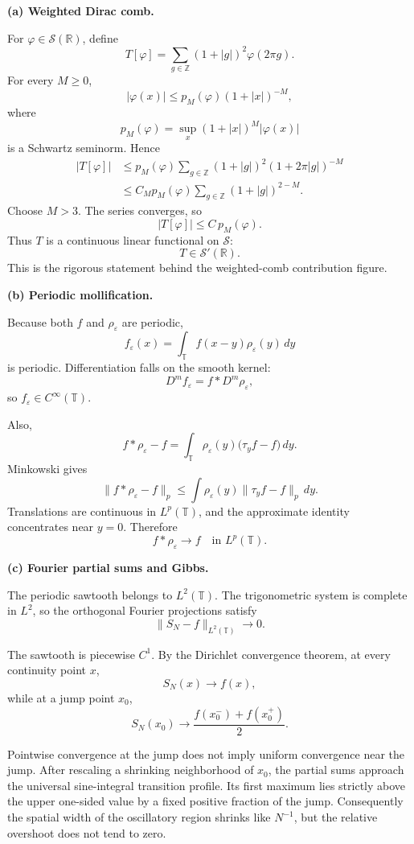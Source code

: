 \begin{solution}
\par\smallskip\noindent\textbf{(a) Weighted Dirac comb.}

For \(\varphi\in\mathcal S(\mathbb R)\), define
\[
T[\varphi]
=
\sum_{g\in\mathbb Z}
(1+|g|)^2\varphi(2\pi g).
\]
For every \(M\ge0\),
\[
|\varphi(x)|
\le
p_M(\varphi)(1+|x|)^{-M},
\]
where
\[
p_M(\varphi)
=
\sup_x
(1+|x|)^M|\varphi(x)|
\]
is a Schwartz seminorm. Hence
\[
\begin{aligned}
|T[\varphi]|
&\le
p_M(\varphi)
\sum_{g\in\mathbb Z}
(1+|g|)^2(1+2\pi|g|)^{-M}\\
&\le
C_M p_M(\varphi)
\sum_{g\in\mathbb Z}
(1+|g|)^{2-M}.
\end{aligned}
\]
Choose \(M>3\). The series converges, so
\[
|T[\varphi]|
\le
C\,p_M(\varphi).
\]
Thus \(T\) is a continuous linear functional on \(\mathcal S\):
\[
\boxed{
T\in\mathcal S'(\mathbb R).}
\]
This is the rigorous statement behind the weighted-comb contribution
figure.

\par\smallskip\noindent\textbf{(b) Periodic mollification.}

Because both \(f\) and \(\rho_\varepsilon\) are periodic,
\[
f_\varepsilon(x)
=
\int_{\mathbb T}
f(x-y)\rho_\varepsilon(y)\,dy
\]
is periodic. Differentiation falls on the smooth kernel:
\[
D^m f_\varepsilon
=
f*D^m\rho_\varepsilon,
\]
so \(f_\varepsilon\in C^\infty(\mathbb T)\).

Also,
\[
f*\rho_\varepsilon-f
=
\int_{\mathbb T}
\rho_\varepsilon(y)
\bigl(\tau_yf-f\bigr)\,dy.
\]
Minkowski gives
\[
\|f*\rho_\varepsilon-f\|_p
\le
\int
\rho_\varepsilon(y)
\|\tau_yf-f\|_p\,dy.
\]
Translations are continuous in \(L^p(\mathbb T)\), and the approximate
identity concentrates near \(y=0\). Therefore
\[
\boxed{
f*\rho_\varepsilon\to f
\quad\text{in }L^p(\mathbb T).}
\]

\par\smallskip\noindent\textbf{(c) Fourier partial sums and Gibbs.}

The periodic sawtooth belongs to \(L^2(\mathbb T)\). The trigonometric
system is complete in \(L^2\), so the orthogonal Fourier projections
satisfy
\[
\boxed{
\|S_N-f\|_{L^2(\mathbb T)}
\longrightarrow0.}
\]

The sawtooth is piecewise \(C^1\). By the Dirichlet convergence theorem,
at every continuity point \(x\),
\[
S_N(x)\to f(x),
\]
while at a jump point \(x_0\),
\[
S_N(x_0)
\to
\frac{f(x_0^-)+f(x_0^+)}2.
\]

Pointwise convergence at the jump does not imply uniform convergence near
the jump. After rescaling a shrinking neighborhood of \(x_0\), the
partial sums approach the universal sine-integral transition profile. Its
first maximum lies strictly above the upper one-sided value by a fixed
positive fraction of the jump. Consequently the spatial width of the
oscillatory region shrinks like \(N^{-1}\), but the relative overshoot does
not tend to zero.


\end{solution}
